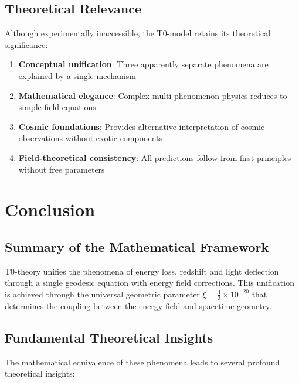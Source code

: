 \documentclass[12pt,a4paper]{article}
\theoremstyle{definition}
\begin{document}
	\subsection{Theoretical Relevance}
	
	Although experimentally inaccessible, the T0-model retains its theoretical significance:
	
	\begin{enumerate}
		\item \textbf{Conceptual unification}: Three apparently separate phenomena are explained by a single mechanism
		\item \textbf{Mathematical elegance}: Complex multi-phenomenon physics reduces to simple field equations
		\item \textbf{Cosmic foundations}: Provides alternative interpretation of cosmic observations without exotic components
		\item \textbf{Field-theoretical consistency}: All predictions follow from first principles without free parameters
	\end{enumerate}
	
	\section{Conclusion}
	
	\subsection{Summary of the Mathematical Framework}
	
	T0-theory unifies the phenomena of energy loss, redshift and light deflection through a single geodesic equation with energy field corrections. This unification is achieved through the universal geometric parameter $\xi = \frac{4}{3} \times 10^{-20}$ that determines the coupling between the energy field and spacetime geometry.
	
	\subsection{Fundamental Theoretical Insights}
	
	The mathematical equivalence of these phenomena leads to several profound theoretical insights:
	
\end{document}

